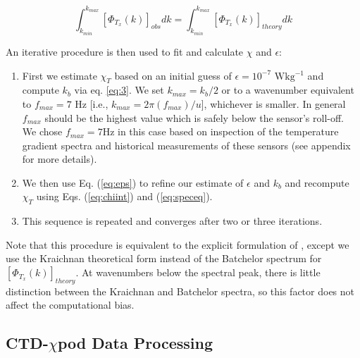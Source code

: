 \documentclass{ametsoc}
\begin{document}
\begin{equation}
\int^{k_{max}}_{k_{min}}[\Phi_{T_x}(k)]_{obs}dk=\int^{k_{max}}_{k_{min}}[\Phi_{T_x}(k)]_{theory}dk
\label{eq:speceq}
\end{equation}

An iterative procedure is then used to fit and calculate $\chi$ and $\epsilon$:

\begin{enumerate}
\item First we estimate $\chi_T$ based on an initial guess of $\epsilon=10^{-7}$ $\mathrm{Wkg^{-1}}$ and compute $k_b$ via eq. \ref{eq:3}. We set $k_{max} = k_b/2$ or to a wavenumber equivalent to $f_{max}=7$ Hz [i.e., $k_{max}= 2\pi(f_{max})/u$], whichever is smaller. In general $f_{max}$ should be the highest value which is safely below the sensor's roll-off. We chose $f_{max}=7$Hz in this case based on inspection of the temperature gradient spectra and historical measurements of these sensors (see appendix for more details).
\item We then use Eq. (\ref{eq:eps}) to refine our estimate of $\epsilon$ and $k_b$ and recompute $\chi_T$ using Eqs. (\ref{eq:chiint}) and (\ref{eq:speceq}). 
\item This sequence is repeated and converges after two or three iterations.
\end{enumerate}
Note that this procedure is equivalent to the explicit formulation of \citep{alfordpinkel00b}, except we use the Kraichnan theoretical form instead of the Batchelor spectrum for $[\Phi_{T_x}(k)]_{theory}$. At wavenumbers below the spectral peak, there is little distinction between the Kraichnan and Batchelor spectra, so this factor does not affect the computational bias.

\subsection{CTD-$\chi$pod Data Processing}
\end{document}
